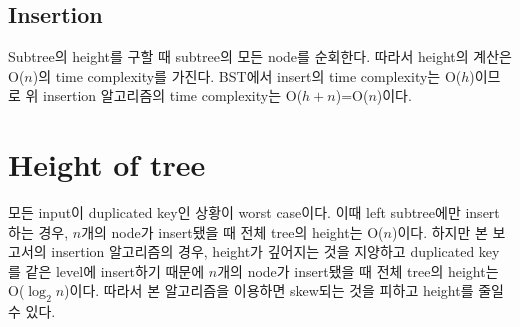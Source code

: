 \documentclass[a4paper, 11pt]{article}
\begin{document}
\subsection{Insertion}
Subtree의 height를 구할 때 subtree의 모든 node를 순회한다. 따라서 height의 계산은 O($n$)의 time complexity를 가진다. BST에서 insert의 time complexity는 O($h$)이므로 위 insertion 알고리즘의 time complexity는 O($h+n$)=O($n$)이다.

\section{Height of tree}
모든 input이 duplicated key인 상황이 worst case이다. 이때 left subtree에만 insert하는 경우, $n$개의 node가 insert됐을 때 전체 tree의 height는 O($n$)이다. 하지만 본 보고서의 insertion 알고리즘의 경우, height가 깊어지는 것을 지양하고 duplicated key를 같은 level에 insert하기 때문에 $n$개의 node가 insert됐을 때 전체 tree의 height는 O($\log_2{n}$)이다. 따라서 본 알고리즘을 이용하면 skew되는 것을 피하고 height를 줄일 수 있다.
\end{document}
